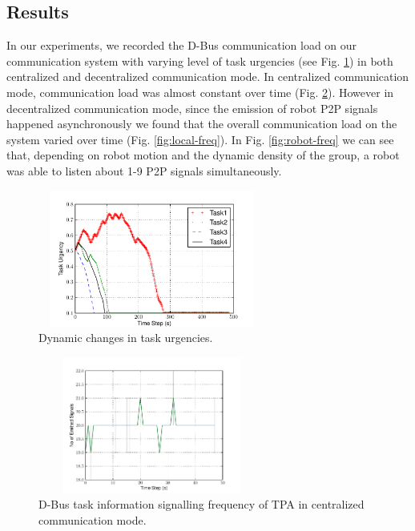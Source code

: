\documentclass{ifacconf}
\begin{document}
\subsection{Results}
In our experiments, we recorded the D-Bus communication load on our communication system with varying level of task urgencies (see Fig. \ref{fig:task-urgency}) in both centralized and decentralized communication mode. In  centralized communication mode, communication load was almost constant over time (Fig. \ref{fig:global-freq}).  However in decentralized communication mode, since the emission of robot P2P signals happened asynchronously we found that the overall communication load on the system varied over time (Fig. \ref{fig:local-freq}). In Fig. \ref{fig:robot-freq} we can see that, depending on robot motion and the dynamic density of the group, a robot was able to listen about 1-9 P2P signals simultaneously.
\begin{figure}
\centering
\includegraphics[width=7.5cm,height=4.5cm]{./images/PlotUrgencyLog-2010Feb15-171017}    %
\caption{Dynamic changes in task urgencies.} 
\label{fig:task-urgency}
\end{figure}
\begin{figure}
\begin{center}
\includegraphics[width=7.5cm,height=4.5cm]{./images/Global-SignalingFreqStat}    %
\caption{D-Bus task information signalling frequency of TPA in centralized communication mode.} 
\label{fig:global-freq}
\end{center}
\end{figure}
\end{document}
